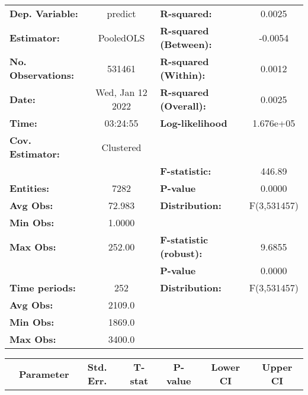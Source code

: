 \begin{center}
\begin{tabular}{lclc}
\toprule
\textbf{Dep. Variable:}    &      predict       & \textbf{  R-squared:         }   &      0.0025      \\
\textbf{Estimator:}        &     PooledOLS      & \textbf{  R-squared (Between):}  &     -0.0054      \\
\textbf{No. Observations:} &       531461       & \textbf{  R-squared (Within):}   &      0.0012      \\
\textbf{Date:}             &  Wed, Jan 12 2022  & \textbf{  R-squared (Overall):}  &      0.0025      \\
\textbf{Time:}             &      03:24:55      & \textbf{  Log-likelihood     }   &    1.676e+05     \\
\textbf{Cov. Estimator:}   &     Clustered      & \textbf{                     }   &                  \\
\textbf{}                  &                    & \textbf{  F-statistic:       }   &      446.89      \\
\textbf{Entities:}         &        7282        & \textbf{  P-value            }   &      0.0000      \\
\textbf{Avg Obs:}          &       72.983       & \textbf{  Distribution:      }   &   F(3,531457)    \\
\textbf{Min Obs:}          &       1.0000       & \textbf{                     }   &                  \\
\textbf{Max Obs:}          &       252.00       & \textbf{  F-statistic (robust):} &      9.6855      \\
\textbf{}                  &                    & \textbf{  P-value            }   &      0.0000      \\
\textbf{Time periods:}     &        252         & \textbf{  Distribution:      }   &   F(3,531457)    \\
\textbf{Avg Obs:}          &       2109.0       & \textbf{                     }   &                  \\
\textbf{Min Obs:}          &       1869.0       & \textbf{                     }   &                  \\
\textbf{Max Obs:}          &       3400.0       & \textbf{                     }   &                  \\
\bottomrule
\end{tabular}
\begin{tabular}{lcccccc}
                & \textbf{Parameter} & \textbf{Std. Err.} & \textbf{T-stat} & \textbf{P-value} & \textbf{Lower CI} & \textbf{Upper CI}  \\

\end{tabular}
\end{center}
